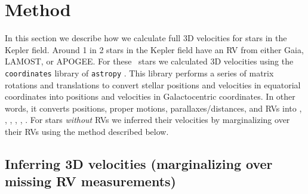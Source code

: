 \section{Method}
\label{sec:method}

In this section we describe how we calculate full 3D velocities for stars in
the Kepler field.
Around 1 in 2 stars in the Kepler field have an RV from either Gaia, LAMOST,
or APOGEE.
For these \nrv\ stars we calculated 3D velocities using the {\tt coordinates}
library of {\tt astropy} \citep{astropy2013, astropy2018}.
This library performs a series of matrix rotations and translations to convert
stellar positions and velocities in equatorial
coordinates into positions and velocities in Galactocentric coordinates.
In other words, it converts positions, proper motions, parallaxes/distances,
and RVs into \x, \y, \z, \vx, \vy, \vz.
For stars {\it without} RVs we inferred their velocities by marginalizing over
their RVs using the method described below.


\subsection{Inferring 3D velocities (marginalizing over missing RV
measurements)}
\label{sec:inference}

